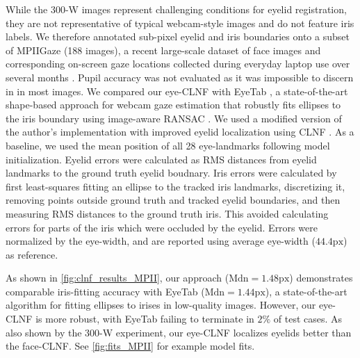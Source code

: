 While the 300-W images represent challenging conditions for eyelid registration, they are not representative of typical webcam-style images and do not feature iris labels.
We therefore annotated sub-pixel eyelid and iris boundaries onto a subset of MPIIGaze (188 images), a recent large-scale dataset of face images and corresponding on-screen gaze locations collected during everyday laptop use over several months \cite{zhang15_cvpr}.
Pupil accuracy was not evaluated as it was impossible to discern in in most images.
We compared our eye-CLNF with EyeTab \cite{wood2014eyetab}, a state-of-the-art shape-based approach for webcam gaze estimation that robustly fits ellipses to the iris boundary using image-aware RANSAC \cite{swirski2012robust}.
We used a modified version of the author's implementation with improved eyelid localization using CLNF \cite{baltrusaitis2013constrained}.
As a baseline, we used the mean position of all 28 eye-landmarks following model initialization.
Eyelid errors were calculated as RMS distances from eyelid landmarks to the ground truth eyelid boudnary.
Iris errors were calculated by first least-squares fitting an ellipse to the tracked iris landmarks, discretizing it, removing points outside ground truth and tracked eyelid boundaries, and then measuring RMS distances to the ground truth iris.
This avoided calculating errors for parts of the iris which were occluded by the eyelid.
Errors were normalized by the eye-width, and are reported using average eye-width ($44.4\textrm{px}$) as reference.

As shown in \autoref{fig:clnf_results_MPII}, our approach ($\textrm{Mdn}\!=\!1.48\textrm{px}$) demonstrates comparable iris-fitting accuracy with EyeTab ($\textrm{Mdn}\!=\!1.44\textrm{px}$), a state-of-the-art algorithm for fitting ellipses to irises in low-quality images.
However, our eye-CLNF is more robust, with EyeTab failing to terminate in $2\%$ of test cases.
As also shown by the 300-W experiment, our eye-CLNF localizes eyelids better than the face-CLNF.
See \autoref{fig:fits_MPII} for example model fits.


